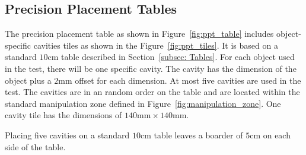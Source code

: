 \subsection{Precision Placement Tables}\label{sec:Precision Placement}

The precision placement table as shown in Figure~\ref{fig:ppt_table} includes object-specific cavities tiles as shown in the Figure~\ref{fig:ppt_tiles}. It is based on a standard $10\si{\centi\meter}$ table described in Section~\ref{subsec: Tables}. For each object used in the test, there will be one specific cavity. The cavity has the dimension of the object plus a $2 \si{\milli\meter}$ offset for each dimension. At most five cavities are used in the test. The cavities are in an random order on the table and are located within the standard manipulation zone defined in Figure~\ref{fig:manipulation_zone}. One cavity tile has the dimensions of $140 \si{\milli\meter} \times 140 \si{\milli\meter} $.

Placing five cavities on a standard $10\si{\centi\meter}$ table leaves a boarder of $5 \si{\centi\meter}$ on each side of the table.

